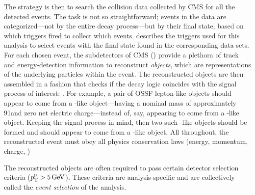 The strategy is then to search the \pp collision data collected by CMS for all the detected \hzzfourl events.
The task is not so straightforward;
events in the data are categorized---not by the entire decay process---but by their final state, based on which triggers fired to collect which events.
 describes the triggers used for this analysis to select events with the \fourl final state found in the corresponding data sets.
For each chosen event, the subdetectors of CMS () provide a plethora of track and energy-detection information to reconstruct \emph{objects}, which are representations of the underlying particles within the event.
The reconstructed objects are then assembled in a fashion that checks if the decay logic coincides with the signal process of interest: \hzzfourl.
For example, a pair of OSSF lepton-like objects should appear to come from a \PZ-like object---\ie having a nominal mass of approximately 91\GeV and zero net electric charge---instead of, say, appearing to come from a \PH-like object.
Keeping the signal process in mind, then two such \PZ-like objects should be formed and should appear to come from a \PH-like object.
All throughout, the reconstructed event must obey all physics conservation laws (energy, momentum, charge, \etc)

The reconstructed objects are often required to pass certain detector selection criteria (\eg $\pt^\Pmu > 5\GeV$).
These criteria are analysis-specific and are collectively called the \emph{event selection} of the analysis.

